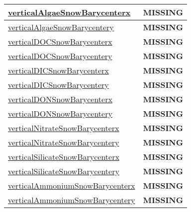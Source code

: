 {\begin{center}
\begin{longtable}{| p{2.0in} | p{4.0in} |}
    \hline
    \hyperref[subsec:var_sec_tracer_barycenter_verticalAlgaeSnowBarycenterx]{verticalAlgaeSnowBarycenterx} & {\bf \color{red} MISSING} \\
    \hline
    \hyperref[subsec:var_sec_tracer_barycenter_verticalAlgaeSnowBarycentery]{verticalAlgaeSnowBarycentery} & {\bf \color{red} MISSING} \\
    \hline
    \hyperref[subsec:var_sec_tracer_barycenter_verticalDOCSnowBarycenterx]{verticalDOCSnowBarycenterx} & {\bf \color{red} MISSING} \\
    \hline
    \hyperref[subsec:var_sec_tracer_barycenter_verticalDOCSnowBarycentery]{verticalDOCSnowBarycentery} & {\bf \color{red} MISSING} \\
    \hline
    \hyperref[subsec:var_sec_tracer_barycenter_verticalDICSnowBarycenterx]{verticalDICSnowBarycenterx} & {\bf \color{red} MISSING} \\
    \hline
    \hyperref[subsec:var_sec_tracer_barycenter_verticalDICSnowBarycentery]{verticalDICSnowBarycentery} & {\bf \color{red} MISSING} \\
    \hline
    \hyperref[subsec:var_sec_tracer_barycenter_verticalDONSnowBarycenterx]{verticalDONSnowBarycenterx} & {\bf \color{red} MISSING} \\
    \hline
    \hyperref[subsec:var_sec_tracer_barycenter_verticalDONSnowBarycentery]{verticalDONSnowBarycentery} & {\bf \color{red} MISSING} \\
    \hline
    \hyperref[subsec:var_sec_tracer_barycenter_verticalNitrateSnowBarycenterx]{verticalNitrateSnowBarycenterx} & {\bf \color{red} MISSING} \\
    \hline
    \hyperref[subsec:var_sec_tracer_barycenter_verticalNitrateSnowBarycentery]{verticalNitrateSnowBarycentery} & {\bf \color{red} MISSING} \\
    \hline
    \hyperref[subsec:var_sec_tracer_barycenter_verticalSilicateSnowBarycenterx]{verticalSilicateSnowBarycenterx} & {\bf \color{red} MISSING} \\
    \hline
    \hyperref[subsec:var_sec_tracer_barycenter_verticalSilicateSnowBarycentery]{verticalSilicateSnowBarycentery} & {\bf \color{red} MISSING} \\
    \hline
    \hyperref[subsec:var_sec_tracer_barycenter_verticalAmmoniumSnowBarycenterx]{verticalAmmoniumSnow\-Barycenterx} & {\bf \color{red} MISSING} \\
    \hline
    \hyperref[subsec:var_sec_tracer_barycenter_verticalAmmoniumSnowBarycentery]{verticalAmmoniumSnow\-Barycentery} & {\bf \color{red} MISSING} \\

\end{longtable}
\end{center}}
